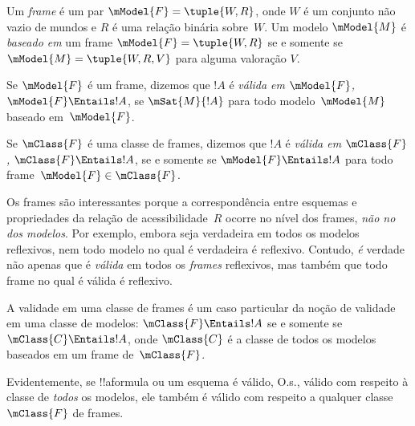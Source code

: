 \documentclass[../../../include/open-logic-section]{subfiles}
\begin{document}


\begin{defn}
  Um \emph{frame} é um par $\mModel{F} = \tuple{W,R}$, onde $W$ é um
  conjunto não vazio de mundos e $R$ é uma relação binária sobre~$W$. Um
  modelo $\mModel{M}$ é \emph{baseado em} um frame
  $\mModel{F} = \tuple{W,R}$ se e somente se
  $\mModel{M} = \tuple{W, R, V}$ para alguma valoração $V$.
\end{defn}

\begin{defn}
  Se $\mModel{F}$ é um frame, dizemos que $!A$ é \emph{válida em
    $\mModel{F}$,} $\mModel{F} \Entails !A$, se $\mSat{M}{!A}$ para todo
  modelo~$\mModel{M}$ baseado em~$\mModel{F}$.
  
  Se $\mClass{F}$ é uma classe de frames, dizemos que $!A$ é \emph{válida em
    $\mClass{F}$,} $\mClass{F} \Entails !A$, se e somente se
  $\mModel{F} \Entails !A$ para todo frame~$\mModel{F} \in \mClass{F}$.
\end{defn}

Os frames são interessantes porque a correspondência entre esquemas e
propriedades da relação de acessibilidade~$R$ ocorre no nível dos frames,
\emph{não no dos modelos}. Por exemplo, embora  seja verdadeira em
todos os modelos reflexivos, nem todo modelo no qual  é verdadeira é
reflexivo. Contudo, \emph{é} verdade não apenas que  é \emph{válida}
em todos os \emph{frames} reflexivos, mas também que todo frame no qual
 é válida é reflexivo.

\begin{rem}
A validade em uma classe de frames é um caso particular da noção de validade
em uma classe de modelos: $\mClass{F} \Entails !A$ se e somente se
$\mClass{C} \Entails !A$, onde $\mClass{C}$ é a classe de todos os modelos
baseados em um frame de~$\mClass{F}$.

Evidentemente, se !!a{formula} ou um esquema é válido, O.s.\@, válido com
respeito à classe de \emph{todos} os modelos, ele também é válido com respeito
a qualquer classe~$\mClass{F}$ de frames.
\end{rem}
\end{document}
